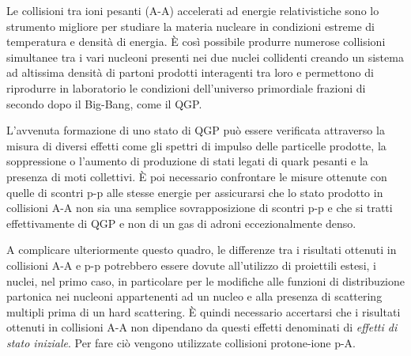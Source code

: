 Le collisioni tra ioni pesanti (A-A) accelerati ad energie relativistiche sono lo strumento migliore per studiare la materia nucleare in condizioni estreme di temperatura e densità di energia. È così possibile produrre numerose collisioni simultanee tra i vari nucleoni presenti nei due nuclei collidenti creando un sistema ad altissima densità di partoni prodotti interagenti tra loro e permettono di riprodurre in laboratorio le condizioni dell'universo primordiale frazioni di secondo dopo il Big-Bang, come il QGP.

L'avvenuta formazione di uno stato di QGP può essere verificata attraverso la misura di diversi effetti come gli spettri di impulso delle particelle prodotte, la soppressione o l'aumento di produzione di stati legati di quark pesanti e la presenza di moti collettivi. È poi necessario confrontare le misure ottenute con quelle di scontri p-p alle stesse energie per assicurarsi che lo stato prodotto in collisioni A-A non sia una semplice sovrapposizione di scontri p-p e che si tratti effettivamente di QGP e non di un gas di adroni eccezionalmente denso.

A complicare ulteriormente questo quadro, le differenze tra i risultati ottenuti in collisioni A-A e p-p potrebbero essere dovute all'utilizzo di proiettili estesi, i nuclei, nel primo caso, in particolare per le modifiche alle funzioni di distribuzione partonica nei nucleoni appartenenti ad un nucleo e alla presenza di scattering multipli prima di un hard scattering. È quindi necessario accertarsi che i risultati ottenuti in collisioni A-A non dipendano da questi effetti denominati di \textit{effetti di stato iniziale}. Per fare ciò vengono utilizzate collisioni protone-ione p-A.

